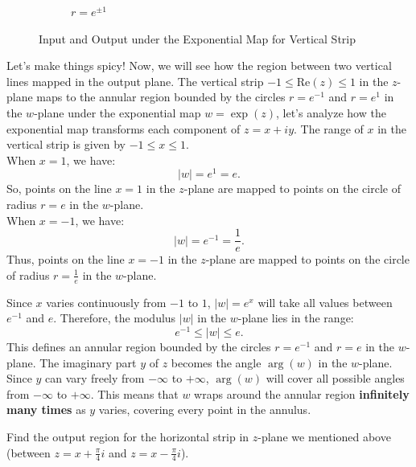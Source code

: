\begin{figure}[htbp]
\begin{subfigure}[b]{0.45\textwidth}
        \caption{$r=e^{\pm1}$}
        \label{fig:exp_outputs_h}
    \end{subfigure}
    \caption{Input and Output under the Exponential Map for Vertical Strip}
    \label{fig:exp_map_vertical_lines}
\end{figure}
Let's make things spicy! Now, we will see how the region between two vertical lines mapped in the output plane.
The vertical strip \( -1 \leq \text{Re}(z) \leq 1 \) in the \( z \)-plane maps to the annular region bounded by the circles \( r = e^{-1} \) and \( r = e^{1} \) in the \( w \)-plane under the exponential map \( w = \exp(z) \), let’s analyze how the exponential map transforms each component of \( z = x + iy \). The range of \( x \) in the vertical strip is given by \( -1 \leq x \leq 1 \).\\
When \( x = 1 \), we have:
   \[
   |w| = e^1 = e.
   \]
   So, points on the line \( x = 1 \) in the \( z \)-plane are mapped to points on the circle of radius \( r = e \) in the \( w \)-plane.\\
When \( x = -1 \), we have:
   \[
   |w| = e^{-1} = \frac{1}{e}.
   \]
   Thus, points on the line \( x = -1 \) in the \( z \)-plane are mapped to points on the circle of radius \( r = \frac{1}{e} \) in the \( w \)-plane.

Since \( x \) varies continuously from \( -1 \) to \( 1 \), \( |w| = e^x \) will take all values between \( e^{-1} \) and \( e \). Therefore, the modulus \( |w| \) in the \( w \)-plane lies in the range:
\[
e^{-1} \leq |w| \leq e.
\]
This defines an annular region bounded by the circles \( r = e^{-1} \) and \( r = e \) in the \( w \)-plane. The imaginary part \( y \) of \( z \) becomes the angle \( \arg(w) \) in the \( w \)-plane. Since \( y \) can vary freely from \( -\infty \) to \( +\infty \), \( \arg(w) \) will cover all possible angles from \( -\infty \) to \( +\infty \). This means that \( w \) wraps around the annular region \textbf{infinitely many times} as \( y \) varies, covering every point in the annulus.
\begin{exercise}
    Find the output region for the horizontal strip in $z$-plane we mentioned above (between $z=x+\frac{\pi}{4}i$ and $z=x-\frac{\pi}{4}i$). 
\end{exercise}
